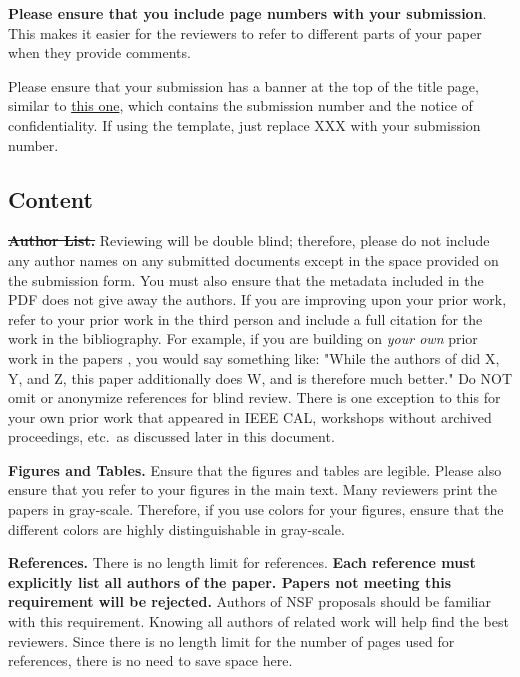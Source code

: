 \documentclass[pageno]{jpaper}
\begin{document}
\textbf{Please ensure that you include page numbers with your
submission}. This makes it easier for the reviewers to refer to different
parts of your paper when they provide comments.

Please ensure that your submission has a banner at the top of the title
page, similar to
\href{http://asplos15.bilkent.edu.tr/files/asplos15-template.pdf}{this
one}, which contains the submission number and the notice of
confidentiality.  If using the template, just replace XXX with your
submission number.

\subsection{Content}

\noindent\textbf{\sout{Author List.}} Reviewing will be double blind;
therefore, please do not include any author names on any submitted
documents except in the space provided on the submission form.  You must
also ensure that the metadata included in the PDF does not give away the
authors. If you are improving upon your prior work, refer to your prior
work in the third person and include a full citation for the work in the
bibliography.  For example, if you are building on {\em your own} prior
work in the papers \cite{nicepaper1,nicepaper2,nicepaper3}, you would say
something like: "While the authors of
\cite{nicepaper1,nicepaper2,nicepaper3} did X, Y, and Z, this paper
additionally does W, and is therefore much better."  Do NOT omit or
anonymize references for blind review.  There is one exception to this for
your own prior work that appeared in IEEE CAL, workshops without archived
proceedings, etc.\, as discussed later in this document.

\noindent\textbf{Figures and Tables.} Ensure that the figures and tables
are legible.  Please also ensure that you refer to your figures in the main
text.  Many reviewers print the papers in gray-scale. Therefore, if you use
colors for your figures, ensure that the different colors are highly
distinguishable in gray-scale.

\noindent\textbf{References.}  There is no length limit for references.
{\bf Each reference must explicitly list all authors of the paper.  Papers
not meeting this requirement will be rejected.} Authors of NSF proposals
should be familiar with this requirement. Knowing all authors of related
work will help find the best reviewers. Since there is no length limit 
for the number of pages used for references, there is no need to save space 
here. 
\end{document}
